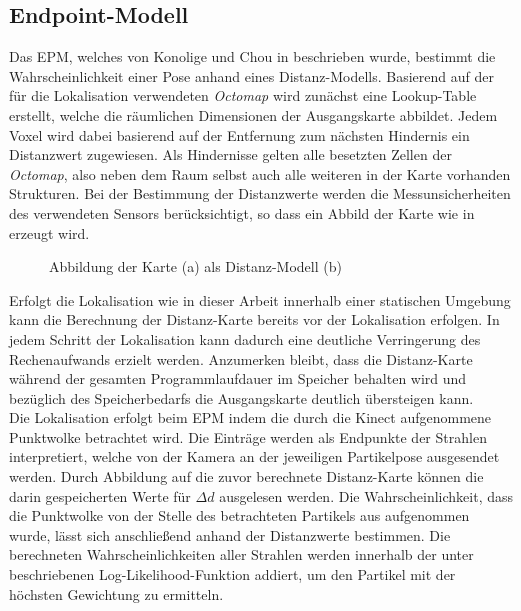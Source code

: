\subsection{Endpoint-Modell}
Das EPM, welches von Konolige und Chou in \cite{Konolige1999} beschrieben wurde, bestimmt die Wahrscheinlichkeit einer Pose anhand eines Distanz-Modells. Basierend auf der für die Lokalisation verwendeten \textit{Octomap} wird zunächst eine Lookup-Table erstellt, welche die räumlichen Dimensionen der Ausgangskarte abbildet. Jedem Voxel wird dabei basierend auf der Entfernung zum nächsten Hindernis ein Distanzwert zugewiesen. Als Hindernisse gelten alle besetzten Zellen der \textit{Octomap}, also neben dem Raum selbst auch alle weiteren in der Karte vorhanden Strukturen. Bei der Bestimmung der Distanzwerte werden die Messunsicherheiten des verwendeten Sensors berücksichtigt, so dass ein Abbild der Karte wie in  erzeugt wird.

\begin{figure}[!ht]
	\begin{center}
	
	\hspace{5mm}
	\caption{Abbildung der Karte (a) als Distanz-Modell (b)}
	\label{fig.dist_map}
	\end{center}
\end{figure}

Erfolgt die Lokalisation wie in dieser Arbeit innerhalb einer statischen Umgebung kann die Berechnung der Distanz-Karte bereits vor der Lokalisation erfolgen. In jedem Schritt der Lokalisation kann dadurch eine deutliche Verringerung des Rechenaufwands erzielt werden. Anzumerken bleibt, dass die Distanz-Karte während der gesamten Programmlaufdauer im Speicher behalten wird und bezüglich des Speicherbedarfs die Ausgangskarte deutlich übersteigen kann.\\

Die Lokalisation erfolgt beim EPM indem die durch die Kinect aufgenommene Punktwolke betrachtet wird. Die Einträge werden als Endpunkte der Strahlen interpretiert, welche von der Kamera an der jeweiligen Partikelpose ausgesendet werden. Durch Abbildung auf die zuvor berechnete Distanz-Karte können die darin gespeicherten Werte für $\Delta d$ ausgelesen werden. Die Wahrscheinlichkeit, dass die Punktwolke von der Stelle des betrachteten Partikels aus aufgenommen wurde, lässt sich anschließend anhand der Distanzwerte bestimmen. Die berechneten Wahrscheinlichkeiten aller Strahlen werden innerhalb der unter  beschriebenen Log-Likelihood-Funktion addiert, um den Partikel mit der höchsten Gewichtung zu ermitteln.\\

